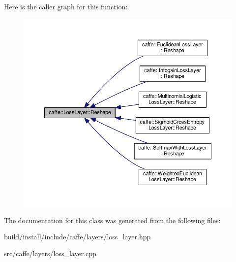 Here is the caller graph for this function\+:
\nopagebreak
\begin{figure}[H]
\begin{center}
\leavevmode
\includegraphics[width=350pt]{classcaffe_1_1_loss_layer_abf00412194f5413ea9468ee44b0d986f_icgraph}
\end{center}
\end{figure}


The documentation for this class was generated from the following files\+:\begin{DoxyCompactItemize}
\item 
build/install/include/caffe/layers/loss\+\_\+layer.\+hpp\item 
src/caffe/layers/loss\+\_\+layer.\+cpp\end{DoxyCompactItemize}
